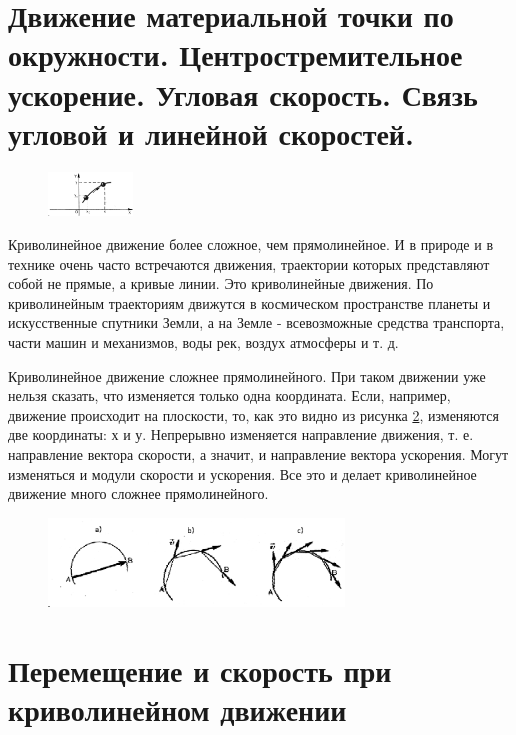 \documentclass[a5paper, 10pt]{diss_4}
\renewcommand{\'}{\,'}
\begin{document}
\section{Движение материальной точки по окружности. Центростремительное ускорение. Угловая скорость. Связь угловой и линейной скоростей.}
\begin{figure}
\includegraphics[width=0.2\textwidth]{img/img16.eps}
\caption{}
\label{kr_l}
\end{figure}

  Криволинейное движение более сложное, чем прямолинейное. И в природе и
в технике очень часто встречаются движения, траектории которых представляют
собой не прямые, а кривые линии. Это криволинейные движения. По криволинейным
траекториям движутся в космическом пространстве планеты и искусственные
спутники Земли, а на Земле - всевозможные средства транспорта, части машин и
механизмов, воды рек, воздух атмосферы и т. д.

  Криволинейное движение сложнее прямолинейного. При таком движении уже
нельзя сказать, что изменяется только одна координата. Если, например, движение
происходит на плоскости, то, как это видно из рисунка \ref{img_18}, изменяются две
координаты: $х$ и $у$. Непрерывно изменяется направление движения, т. е.
направление вектора скорости, а значит, и направление вектора ускорения. Могут
изменяться и модули скорости и ускорения. Все это и делает криволинейное
движение много сложнее прямолинейного.

\begin{figure}[h!]
\begin{center}
  \includegraphics[width=0.7\textwidth]{img/img18.eps}\\
\end{center}
  \caption{}\label{img_18}
\end{figure}

\section{Перемещение и скорость при криволинейном движении}
\end{document}

